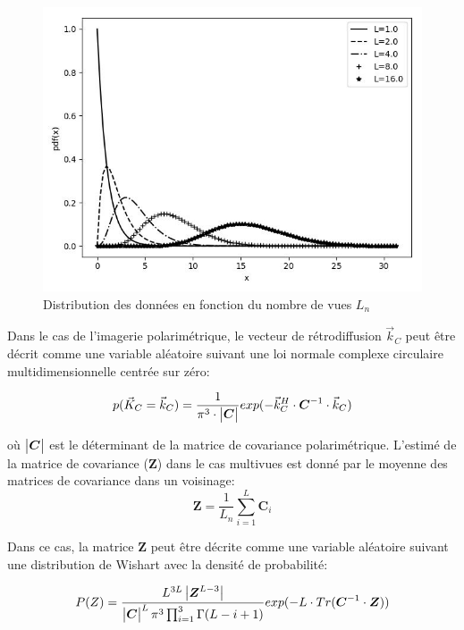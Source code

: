 \begin{figure}[!htbp] 
  \includegraphics[width=0.85 \linewidth]{figures/gamma-pdf-diagram.jpg}
   \centering
        \caption
        {\small Distribution des données \acrsar en fonction du nombre de vues $L_n$}
  \label{fig:gamma-diagram}
\end{figure}

Dans le cas de l'imagerie polarimétrique, le vecteur de rétrodiffusion $\Vec{k}_C$ peut être décrit comme une variable aléatoire suivant une loi normale complexe circulaire multidimensionnelle centrée sur zéro:

\begin{equation}
p(\Vec{K}_C=\Vec{k}_C) = \frac{1}{\pi^3\cdot\begin{vmatrix} \boldsymbol{C}\end{vmatrix}} exp(-\Vec{k}_{C}^{H}\cdot\boldsymbol{C}^{-1}\cdot\Vec{k}_{C})
\end{equation}

\vspace{10pt}

où $\begin{vmatrix} \boldsymbol{C}\end{vmatrix}$ est le déterminant de la matrice de covariance polarimétrique. L'estimé de la matrice de covariance ($\boldsymbol{Z}$) dans le cas multivues est donné par le moyenne des matrices de covariance dans un voisinage:
\begin{equation}
\boldsymbol{Z}=\frac{1}{L_n} \sum_{i=1}^{L}{\boldsymbol{C}_i}
\end{equation}

\vspace{10pt}

Dans ce cas, la matrice $\boldsymbol{Z}$ peut être décrite comme une variable aléatoire suivant une distribution de Wishart avec la densité de probabilité:

\begin{equation}
    P(Z) =  \frac{L^{3L} \begin{vmatrix} \boldsymbol{Z}^{L-3}\end{vmatrix}  }{\begin{vmatrix} \boldsymbol{C}\end{vmatrix}^L\pi^3 \prod_{i=1}^{3} \Gamma(L-i+1)} exp(-L\cdot Tr(\boldsymbol{C}^{-1} \cdot \boldsymbol{Z}))
\end{equation}

